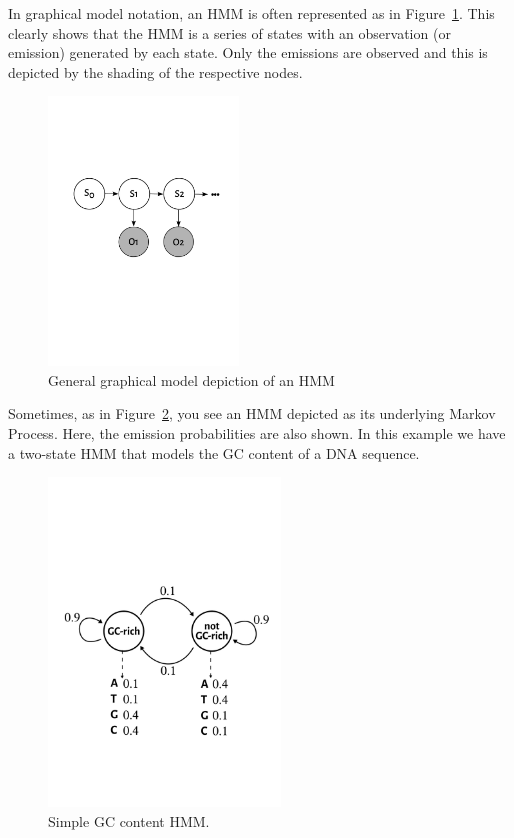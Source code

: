 \documentclass[11pt, oneside]{article}
\begin{document}
In graphical model notation, an HMM is often represented as in Figure~\ref{fig:pgm}. This clearly shows that the HMM is a series of states with an observation (or emission) generated by each state. Only the emissions are observed and this is depicted by the shading of the respective nodes.

\begin{figure}[H]
\centering
\includegraphics[width=0.45\textwidth]{../figures/hmmTemplate.pdf}
\caption{General graphical model depiction of an HMM}
\label{fig:pgm}
\end{figure}

Sometimes, as in Figure~\ref{fig:gc}, you see an HMM depicted as its underlying Markov Process. Here, the emission probabilities are also shown. In this example we have a two-state HMM that models the GC content of a DNA sequence. 

\begin{figure}[H]
\centering
\includegraphics[width=0.55\textwidth]{../figures/hmmGC.pdf}
\caption{Simple GC content HMM.}
\label{fig:gc}
\end{figure}
\end{document}

